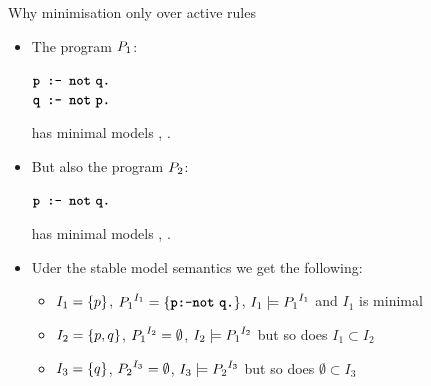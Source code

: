 \documentclass{beamer}
\begin{document}
\begin{frame}{Why minimisation only over active rules}
	\onslide<+->
	
	\begin{itemize}
		\item The program $\prog_1$:
		\begin{center}
			$\code{p :- not}\ \code{q.}$\\
			$\code{q :- not}\ \code{p.}$
		\end{center}
		has minimal models , .
		
		\onslide<+->
		
		\item But also the program $\prog_2$:
		\begin{center}
			$\code{p :- not}\ \code{q.}$
		\end{center}
		has minimal models , {\color{red}}.
		
		\onslide<+->
		
		\item Uder the stable model semantics we get the following:
		\begin{itemize}
			\item $I_1 = \set{p}$, $\activerules{I_1}{\prog_1} = \set{\code{p:-not}\ \code{q.}}$, $I_1\models\activerules{I_1}{\prog_1}$ and $I_1$ is minimal\\
			\onslide<+->
			\item $I_2 = \set{p,q}$, $\activerules{I_2}{\prog_1} = \emptyset$, $I_2\models\activerules{I_2}{\prog_1}$ but so does $I_1 \subset I_2$\\
			\onslide<+->
			\item $I_3 = \set{q}$, $\activerules{I_3}{\prog_2} = \emptyset$, $I_3\models\activerules{I_3}{\prog_2}$ but so does $\emptyset \subset I_3$
		\end{itemize}
		
	\end{itemize}
	
\end{frame}
\end{document}

